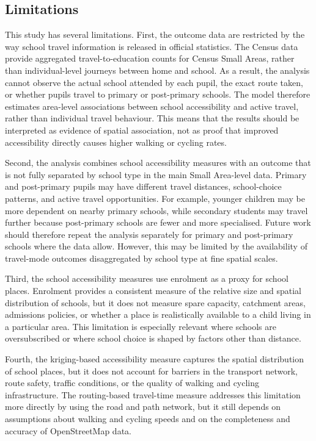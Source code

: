 \documentclass{article}
\begin{document}
\subsection{Limitations}\label{limitations}

This study has several limitations. First, the outcome data are
restricted by the way school travel information is released in official
statistics. The Census data provide aggregated travel-to-education
counts for Census Small Areas, rather than individual-level journeys
between home and school. As a result, the analysis cannot observe the
actual school attended by each pupil, the exact route taken, or whether
pupils travel to primary or post-primary schools. The model therefore
estimates area-level associations between school accessibility and
active travel, rather than individual travel behaviour. This means that
the results should be interpreted as evidence of spatial association,
not as proof that improved accessibility directly causes higher walking
or cycling rates.

Second, the analysis combines school accessibility measures with an
outcome that is not fully separated by school type in the main Small
Area-level data. Primary and post-primary pupils may have different
travel distances, school-choice patterns, and active travel
opportunities. For example, younger children may be more dependent on
nearby primary schools, while secondary students may travel further
because post-primary schools are fewer and more specialised. Future work
should therefore repeat the analysis separately for primary and
post-primary schools where the data allow. However, this may be limited
by the availability of travel-mode outcomes disaggregated by school type
at fine spatial scales.

Third, the school accessibility measures use enrolment as a proxy for
school places. Enrolment provides a consistent measure of the relative
size and spatial distribution of schools, but it does not measure spare
capacity, catchment areas, admissions policies, or whether a place is
realistically available to a child living in a particular area. This
limitation is especially relevant where schools are oversubscribed or
where school choice is shaped by factors other than distance.

Fourth, the kriging-based accessibility measure captures the spatial
distribution of school places, but it does not account for barriers in
the transport network, route safety, traffic conditions, or the quality
of walking and cycling infrastructure. The routing-based travel-time
measure addresses this limitation more directly by using the road and
path network, but it still depends on assumptions about walking and
cycling speeds and on the completeness and accuracy of OpenStreetMap
data.
\end{document}
